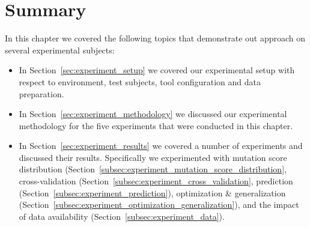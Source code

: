 \section{Summary}
\label{sec:experiment_summary}
In this chapter we covered the following topics that demonstrate out approach on several experimental subjects:

\begin{itemize}
  \item In Section~\ref{sec:experiment_setup} we covered our experimental setup with respect to environment, test subjects, tool configuration and data preparation.
  \item In Section~\ref{sec:experiment_methodology} we discussed our experimental methodology for the five experiments that were conducted in this chapter.
  \item In Section~\ref{sec:experiment_results} we covered a number of experiments and discussed their results. Specifically we experimented with mutation score distribution (Section~\ref{subsec:experiment_mutation_score_distribution}, cross-validation (Section~\ref{subsec:experiment_cross_validation}, prediction (Section~\ref{subsec:experiment_prediction}), optimization \& generalization (Section~\ref{subsec:experiment_optimization_generalization}), and the impact of data availability (Section~\ref{subsec:experiment_data}).
\end{itemize}

